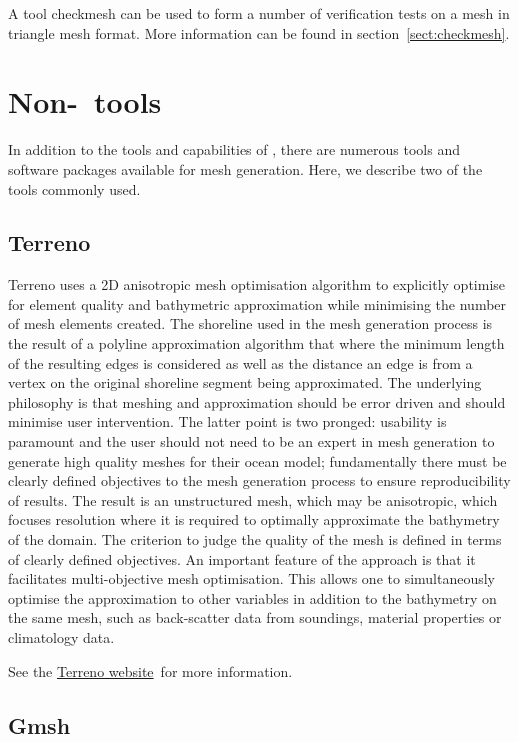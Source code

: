 A tool checkmesh can be used to form a number of verification tests on a mesh
in triangle mesh format. More information can be found in section~\ref{sect:checkmesh}.

\section{Non-\fluidity\ tools}

In addition to the tools and capabilities of \fluidity, there are numerous
tools and software packages available for mesh generation. Here, we describe 
two of the tools commonly used.

\subsection{Terreno}

Terreno uses a 2D anisotropic mesh optimisation algorithm to explicitly optimise for 
element quality and bathymetric approximation while minimising the number of mesh
elements created. The shoreline used in the mesh generation process is the result 
of a polyline approximation algorithm that where the minimum length of the resulting 
edges is considered as well as the distance an edge is from a vertex on the original 
shoreline segment being approximated. The underlying philosophy is that meshing and 
approximation should be error driven and should minimise user intervention. The 
latter point is two pronged: usability is paramount and the user should not need 
to be an expert in mesh generation to generate high quality meshes for their ocean 
model; fundamentally there must be clearly defined objectives to the mesh generation 
process to ensure reproducibility of results. The result is an unstructured mesh, 
which may be anisotropic, which focuses resolution where it is required to optimally 
approximate the bathymetry of the domain. The criterion to judge the quality of the 
mesh is defined in terms of clearly defined objectives. An important feature of the 
approach is that it facilitates multi-objective mesh optimisation. This allows one to 
simultaneously optimise the approximation to other variables in addition to the 
bathymetry on the same mesh, such as back-scatter data from soundings, material 
properties or climatology data. 

See the \href{http://amcg.ese.ic.ac.uk/terreno}{Terreno website}\ for more information.

\subsection{Gmsh}
\label{sect:meshing_tools_non_fluidity_gmsh}

